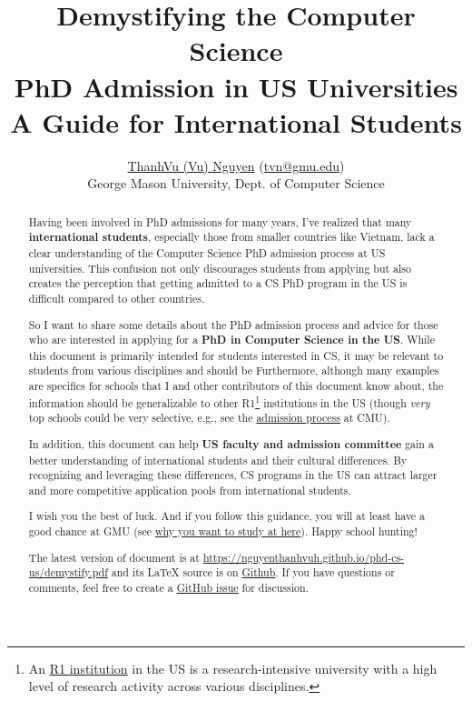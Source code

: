 \documentclass[11pt]{article}
\title{\vspace{-1in} Demystifying the Computer Science \\PhD Admission in US Universities\\{\large A Guide for International Students}}
\author{\href{https://nguyenthanhvuh.github.io}{ThanhVu (Vu) Nguyen} (\href{mailto:tvn@gmu.edu}{tvn@gmu.edu})\\{\small George Mason University, Dept. of Computer Science}}
\begin{document}
\maketitle
\setcounter{section}{-1}

\begin{abstract}
    Having been involved in PhD admissions for many years, I've
    realized that many \textbf{international students}, especially those from smaller countries like Vietnam, lack a clear understanding of
    the Computer Science PhD admission process at US universities. This confusion not only
    discourages students from applying but also creates the perception that
    getting admitted to a CS PhD program in the US is difficult compared to other countries.
    
    So I want to share some details about the PhD admission process and advice for those who are interested in applying for a \textbf{PhD in Computer Science in the US}.
    While this document is primarily intended for students interested in CS, it may be relevant to students from various disciplines and should be 
    Furthermore, although many examples are specifics for schools that I and other contributors of this document know about, the information should be generalizable to other R1\footnote{An \href{https://en.wikipedia.org/wiki/List_of_research_universities_in_the_United_States}{R1 institution} in the US is a research-intensive university with a high level of research activity across various disciplines.} institutions in the US  (though \emph{very} top schools could be very selective, e.g., see the \href{https://da-data.blogspot.com/2015/03/reflecting-on-cs-graduate-admissions.html}{admission process} at CMU).
    
    In addition, this document can help \textbf{US faculty and admission committee} gain a better understanding of international students and their cultural differences.  By recognizing and leveraging these differences, CS programs in the US can attract larger and more competitive application pools from international students.
    
    I wish you the best of luck. And if you follow this guidance, you will at least have a good chance at GMU (see
    \href{https://github.com/dynaroars/dynaroars.github.io/wiki/About-GMU}{why
    you want to study at here}). Happy school hunting!
    
    The latest version of document is at \url{https://nguyenthanhvuh.github.io/phd-cs-us/demystify.pdf} and its \LaTeX{} source is on \href{https://github.com/nguyenthanhvuh/phd-cs-us}{Github}. If you have questions or comments, feel free to create a \href{https://github.com/nguyenthanhvuh/phd-cs-us/issues}{GitHub issue} for discussion.
\end{abstract}
\end{document}
